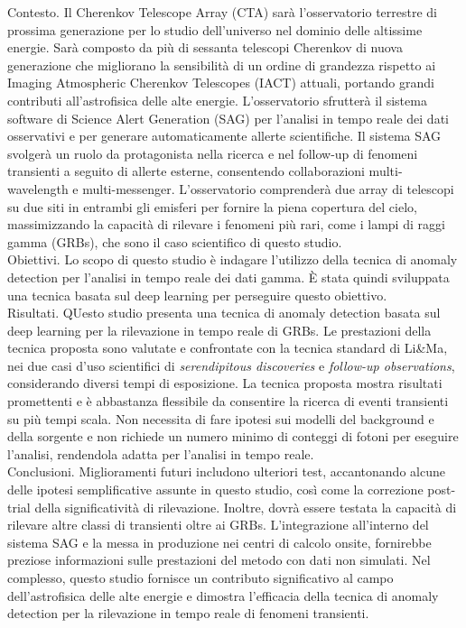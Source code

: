 Contesto. Il Cherenkov Telescope Array (CTA) sarà l'osservatorio terrestre di prossima generazione per lo studio dell'universo nel dominio delle altissime energie. Sarà composto da più di sessanta telescopi Cherenkov di nuova generazione che migliorano la sensibilità di un ordine di grandezza rispetto ai Imaging Atmospheric Cherenkov Telescopes (IACT) attuali, portando grandi contributi all'astrofisica delle alte energie. L'osservatorio sfrutterà il sistema software di Science Alert Generation (SAG) per l'analisi in tempo reale dei dati osservativi e per generare automaticamente allerte scientifiche. Il sistema SAG svolgerà un ruolo da protagonista nella ricerca e nel follow-up di fenomeni transienti a seguito di allerte esterne, consentendo collaborazioni multi-wavelength e multi-messenger. L'osservatorio comprenderà due array di telescopi su due siti in entrambi gli emisferi per fornire la piena copertura del cielo, massimizzando la capacità di rilevare i fenomeni più rari, come i lampi di raggi gamma (GRBs), che sono il caso scientifico di questo studio. \\
Obiettivi. Lo scopo di questo studio è indagare l'utilizzo della tecnica di anomaly detection per l'analisi in tempo reale dei dati gamma. È stata quindi sviluppata una tecnica basata sul deep learning per perseguire questo obiettivo. \\
Risultati. QUesto studio presenta una tecnica di anomaly detection basata sul deep learning per la rilevazione in tempo reale di GRBs. Le prestazioni della tecnica proposta sono valutate e confrontate con la tecnica standard di Li\&Ma,
nei due casi d'uso scientifici di \textit{serendipitous discoveries} e \textit{follow-up observations}, considerando diversi tempi di esposizione. La tecnica proposta mostra risultati promettenti e è abbastanza flessibile da consentire la ricerca di eventi transienti su più tempi scala. Non necessita di fare ipotesi sui modelli del background e della sorgente e non richiede un numero minimo di conteggi di fotoni per eseguire l'analisi, rendendola adatta per l'analisi in tempo reale. \\
Conclusioni. Miglioramenti futuri includono ulteriori test, accantonando alcune delle ipotesi semplificative assunte in questo studio, così come la correzione post-trial della significatività di rilevazione. Inoltre, dovrà essere testata la capacità di rilevare altre classi di transienti oltre ai GRBs. L'integrazione all'interno del sistema SAG e la messa in produzione nei centri di calcolo onsite, fornirebbe preziose informazioni sulle prestazioni del metodo con dati non simulati. Nel complesso, questo studio fornisce un contributo significativo al campo dell'astrofisica delle alte energie e dimostra l'efficacia della tecnica di anomaly detection per la rilevazione in tempo reale di fenomeni transienti.